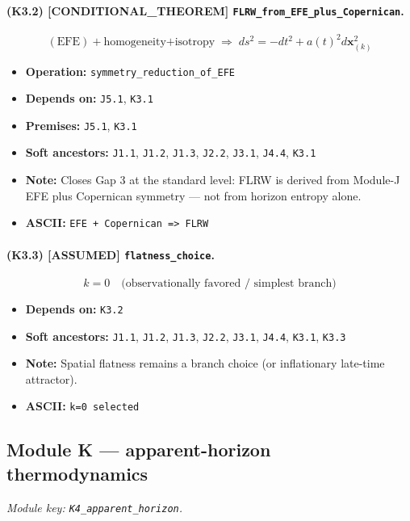 \documentclass[11pt,a4paper]{article}
\theoremstyle{remark}\newtheorem*{caution}{Caution}
\newcommand{\tagbox}[1]{\textsc{[#1]}}
\begin{document}
\paragraph{(K3.2) \tagbox{CONDITIONAL\_THEOREM} \texttt{FLRW\_from\_EFE\_plus\_Copernican}.}
\begin{equation}
(\mathrm{EFE})+\text{homogeneity+isotropy}\;\Rightarrow\;ds^2=-dt^2+a(t)^2 d\mathbf{x}^2_{(k)}
\tag{K3.2}
\end{equation}
\begin{itemize}\setlength{\itemsep}{0.12em}
\item \textbf{Operation:} \texttt{symmetry\_reduction\_of\_EFE}
\item \textbf{Depends on:} \texttt{J5.1}, \texttt{K3.1}
\item \textbf{Premises:} \texttt{J5.1}, \texttt{K3.1}
\item \textbf{Soft ancestors:} \texttt{J1.1}, \texttt{J1.2}, \texttt{J1.3}, \texttt{J2.2}, \texttt{J3.1}, \texttt{J4.4}, \texttt{K3.1}
\item \textbf{Note:} Closes Gap 3 at the standard level: FLRW is derived from Module-J EFE plus Copernican symmetry — not from horizon entropy alone.
\item \textbf{ASCII:} \texttt{EFE + Copernican => FLRW}
\end{itemize}
\paragraph{(K3.3) \tagbox{ASSUMED} \texttt{flatness\_choice}.}
\begin{equation}
k=0\quad\text{(observationally favored / simplest branch)}
\tag{K3.3}
\end{equation}
\begin{itemize}\setlength{\itemsep}{0.12em}
\item \textbf{Depends on:} \texttt{K3.2}
\item \textbf{Soft ancestors:} \texttt{J1.1}, \texttt{J1.2}, \texttt{J1.3}, \texttt{J2.2}, \texttt{J3.1}, \texttt{J4.4}, \texttt{K3.1}, \texttt{K3.3}
\item \textbf{Note:} Spatial flatness remains a branch choice (or inflationary late-time attractor).
\item \textbf{ASCII:} \texttt{k=0 selected}
\end{itemize}
\subsection{Module K --- apparent-horizon thermodynamics}
\textit{Module key: \texttt{K4\_apparent\_horizon}.}
\end{document}
